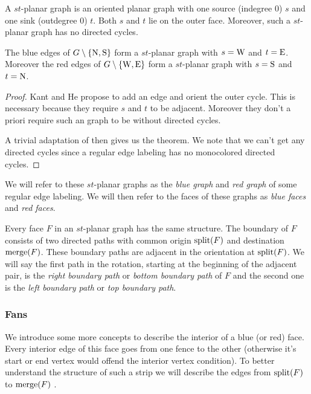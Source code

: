     A $st$-planar graph is an oriented planar graph with one source (indegree 0) $s$ and one sink (outdegree 0) $t$. Both $s$ and $t$ lie on the outer face. Moreover, such a $st$-planar graph has no directed cycles.

    \begin{thrm}
      \label{th:rel:stPlanarGraphs}
      The blue edges of $G\setminus \left\lbrace {\mathrm{N},\mathrm{S}} \right\rbrace$ form a $st$-planar graph with $s= \mathrm{W}$ and $t=\mathrm{E}$. Moreover the red edges of $G\setminus \left\lbrace {\mathrm{W},\mathrm{E}} \right\rbrace$ form a $st$-planar graph with $s= \mathrm{S}$ and $t= \mathrm{N}$.
    \end{thrm}
    \begin{proof}
      Kant and He propose to add an edge and orient the outer cycle. This is necessary because they require $s$ and $t$ to be adjacent. Moreover they don't a priori require such an graph to be without directed cycles.

      A trivial adaptation of \cite[pp.179]{Kant1997} then gives us the theorem. We note that we can't get any directed cycles since a regular edge labeling has no monocolored directed cycles.
    \end{proof}

    We will refer to these $st$-planar graphs as the \emph{blue graph} and \emph{red graph} of some regular edge labeling. We will then refer to the faces of these graphs as \emph{blue faces} and \emph{red faces}.

    Every face $F$ in an $st$-planar graph has the same structure. The boundary of $F$ consists of two directed paths with common origin $\operatorname{split}(F)$ and  destination $\operatorname{merge}(F)$.
    These boundary paths are adjacent in the orientation at $\operatorname{split}(F)$. We will say the first path in the rotation, starting at the beginning of the adjacent pair, is the \emph{right boundary path} or \emph{bottom boundary path} of $F$ and the second one is the \emph{left boundary path} or \emph{top boundary path}.

    \subsubsection{Fans}
    We introduce some more concepts to describe the interior of a blue (or red) face. Every interior edge of this face goes from one fence to the other (otherwise it's start or end vertex would offend the interior vertex condition).  To better understand the structure of such a strip we will describe the edges from $\operatorname{split}(F)$ to $\operatorname{merge}(F)$ .

